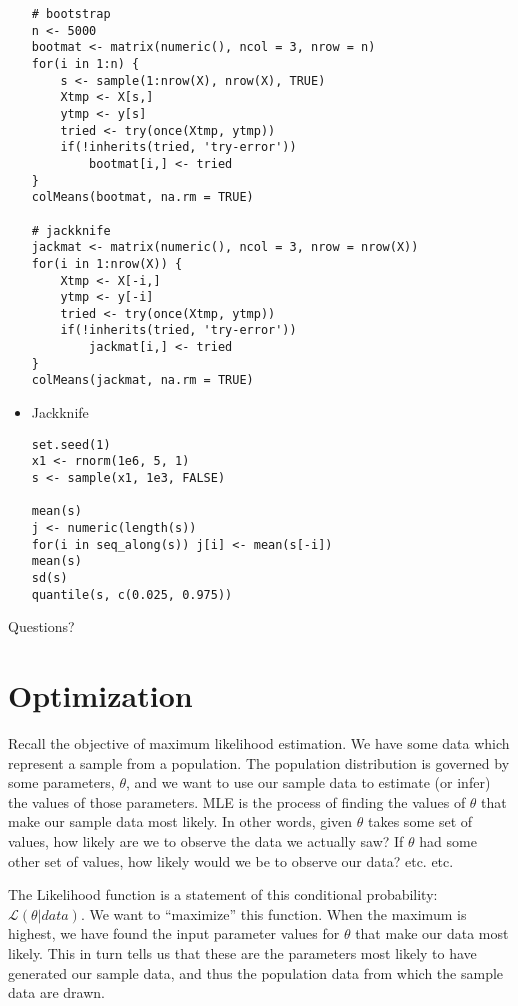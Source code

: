 \documentclass[a4paper,12pt]{article}
\newcommand{\lik}{\mathcal{L}}
\begin{document}
\begin{itemize}
\begin{lstlisting}
# bootstrap
n <- 5000
bootmat <- matrix(numeric(), ncol = 3, nrow = n)
for(i in 1:n) {
    s <- sample(1:nrow(X), nrow(X), TRUE)
    Xtmp <- X[s,]
    ytmp <- y[s]
    tried <- try(once(Xtmp, ytmp))
    if(!inherits(tried, 'try-error'))
        bootmat[i,] <- tried
}
colMeans(bootmat, na.rm = TRUE)

# jackknife
jackmat <- matrix(numeric(), ncol = 3, nrow = nrow(X))
for(i in 1:nrow(X)) {
    Xtmp <- X[-i,]
    ytmp <- y[-i]
    tried <- try(once(Xtmp, ytmp))
    if(!inherits(tried, 'try-error'))
        jackmat[i,] <- tried
}
colMeans(jackmat, na.rm = TRUE)
\end{lstlisting}



\item Jackknife

\begin{lstlisting}
set.seed(1)
x1 <- rnorm(1e6, 5, 1)
s <- sample(x1, 1e3, FALSE)

mean(s)
j <- numeric(length(s))
for(i in seq_along(s)) j[i] <- mean(s[-i])
mean(s)
sd(s)
quantile(s, c(0.025, 0.975))
\end{lstlisting}

\end{itemize}



Questions? 


\section{Optimization}

Recall the objective of maximum likelihood estimation. We have some data which represent a sample from a population. The population distribution is governed by some parameters, $\theta$, and we want to use our sample data to estimate (or infer) the values of those parameters. MLE is the process of finding the values of $\theta$ that make our sample data most likely. In other words, given $\theta$ takes some set of values, how likely are we to observe the data we actually saw? If $\theta$ had some other set of values, how likely would we be to observe our data? etc. etc.

The Likelihood function is a statement of this conditional probability: $\lik(\theta|data)$. We want to ``maximize'' this function. When the maximum is highest, we have found the input parameter values for $\theta$ that make our data most likely. This in turn tells us that these are the parameters most likely to have generated our sample data, and thus the population data from which the sample data are drawn.
\end{document}
